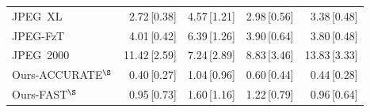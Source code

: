 \begin{tabular}{lrrrr}
    JPEG~XL & 2.72\,{\scriptsize[0.38]} & 4.57\,{\scriptsize[1.21]} & 2.98\,{\scriptsize[0.56]} & 3.38\,{\scriptsize[0.48]} \\
    JPEG-FzT & 4.01\,{\scriptsize[0.42]} & 6.39\,{\scriptsize[1.26]} & 3.90\,{\scriptsize[0.64]} & 3.80\,{\scriptsize[0.48]} \\
    JPEG~2000 & 11.42\,{\scriptsize[2.59]} & 7.24\,{\scriptsize[2.89]} & 8.83\,{\scriptsize[3.46]} & 13.83\,{\scriptsize[3.33]} \\
    Ours-ACCURATE$^{\S}$ & 0.40\,{\scriptsize[0.27]} & 1.04\,{\scriptsize[0.96]} & 0.60\,{\scriptsize[0.44]} & 0.44\,{\scriptsize[0.28]} \\
    Ours-FAST$^{\S}$ & 0.95\,{\scriptsize[0.73]} & 1.60\,{\scriptsize[1.16]} & 1.22\,{\scriptsize[0.79]} & 0.96\,{\scriptsize[0.64]} \\
\bottomrule
\end{tabular}
